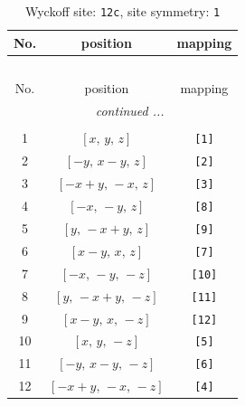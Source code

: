 \documentclass[fleqn,8pt]{jsarticle}
\begin{document}
\begin{longtable}{ccc}
\caption{Wyckoff site: {\tt 12c}, site symmetry: {\tt 1}}
 \\
 \hline \hline
No. & position & mapping \\ \hline \endfirsthead

\multicolumn{2}{l}{\tablename\ \thetable{}} \\
 \hline \hline
No. & position & mapping \\ \hline \endhead

 \hline \hline
\multicolumn{2}{r}{\footnotesize\it continued ...} \\ \endfoot

 \hline \hline
\multicolumn{2}{r}{} \\ \endlastfoot

1 & $\left[ x,\, y,\, z \right]$ & {\tt [1]} \\ \hline
2 & $\left[ - y,\, x - y,\, z \right]$ & {\tt [2]} \\ \hline
3 & $\left[ - x + y,\, - x,\, z \right]$ & {\tt [3]} \\ \hline
4 & $\left[ - x,\, - y,\, z \right]$ & {\tt [8]} \\ \hline
5 & $\left[ y,\, - x + y,\, z \right]$ & {\tt [9]} \\ \hline
6 & $\left[ x - y,\, x,\, z \right]$ & {\tt [7]} \\ \hline
7 & $\left[ - x,\, - y,\, - z \right]$ & {\tt [10]} \\ \hline
8 & $\left[ y,\, - x + y,\, - z \right]$ & {\tt [11]} \\ \hline
9 & $\left[ x - y,\, x,\, - z \right]$ & {\tt [12]} \\ \hline
10 & $\left[ x,\, y,\, - z \right]$ & {\tt [5]} \\ \hline
11 & $\left[ - y,\, x - y,\, - z \right]$ & {\tt [6]} \\ \hline
12 & $\left[ - x + y,\, - x,\, - z \right]$ & {\tt [4]} \\
\end{longtable}
\end{document}
